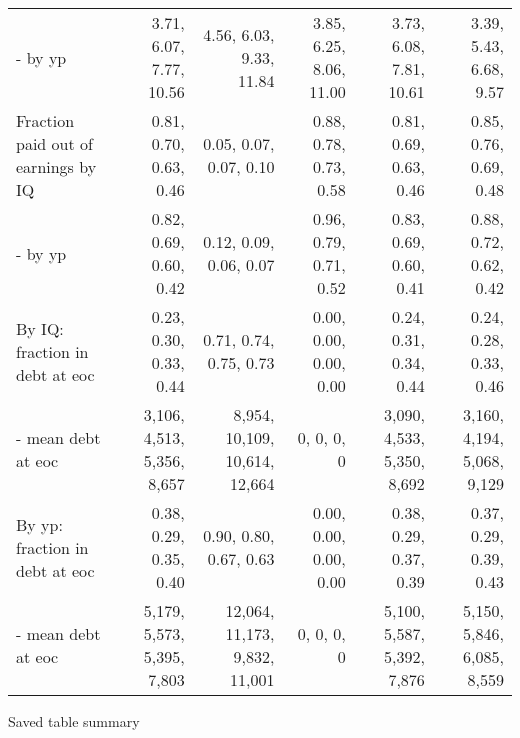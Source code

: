 \begin{tabular}{lrrrrr}
- by yp & 3.71, 6.07, 7.77, 10.56  & 4.56, 6.03, 9.33, 11.84  & 3.85, 6.25, 8.06, 11.00  & 3.73, 6.08, 7.81, 10.61  & 3.39, 5.43, 6.68, 9.57  \\
Fraction paid out of earnings by IQ & 0.81, 0.70, 0.63, 0.46  & 0.05, 0.07, 0.07, 0.10  & 0.88, 0.78, 0.73, 0.58  & 0.81, 0.69, 0.63, 0.46  & 0.85, 0.76, 0.69, 0.48  \\
- by yp & 0.82, 0.69, 0.60, 0.42  & 0.12, 0.09, 0.06, 0.07  & 0.96, 0.79, 0.71, 0.52  & 0.83, 0.69, 0.60, 0.41  & 0.88, 0.72, 0.62, 0.42  \\
By IQ: fraction in debt at eoc & 0.23, 0.30, 0.33, 0.44  & 0.71, 0.74, 0.75, 0.73  & 0.00, 0.00, 0.00, 0.00  & 0.24, 0.31, 0.34, 0.44  & 0.24, 0.28, 0.33, 0.46  \\
- mean debt at eoc & 3,106, 4,513, 5,356, 8,657  & 8,954, 10,109, 10,614, 12,664  & 0, 0, 0, 0  & 3,090, 4,533, 5,350, 8,692  & 3,160, 4,194, 5,068, 9,129  \\
By yp: fraction in debt at eoc & 0.38, 0.29, 0.35, 0.40  & 0.90, 0.80, 0.67, 0.63  & 0.00, 0.00, 0.00, 0.00  & 0.38, 0.29, 0.37, 0.39  & 0.37, 0.29, 0.39, 0.43  \\
- mean debt at eoc & 5,179, 5,573, 5,395, 7,803  & 12,064, 11,173, 9,832, 11,001  & 0, 0, 0, 0  & 5,100, 5,587, 5,392, 7,876  & 5,150, 5,846, 6,085, 8,559  \\
\hline
\end{tabular}%
Saved table summary

